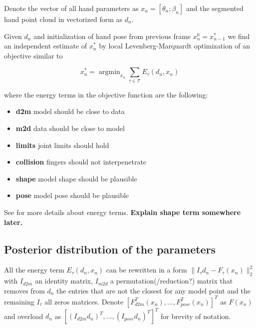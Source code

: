 \documentclass[10pt,twocolumn,letterpaper]{article}
\begin{document}
Denote the vector of all hand parameters as $x_n = [\theta_n; \beta_n]$ and the segmented hand point cloud in vectorized form as $d_n$. 

Given $d_n$ and initialization of hand pose from previous frame $x_n^0 = x_{n - 1}^*$ we find an independent estimate of $x_n^*$ by local Levenberg-Marquardt optimization of an objective similar to \cite{tkach2016sphere}

\begin{equation}
x_n^* = \operatorname{argmin}_{x_n} \sum_{\tau \in \mathcal{T}} E_{\tau}(d_n, x_n) \label{eq:energies}
\end{equation}

where the energy terms in the objective function are the following:

\begin{itemize}
\item \textbf{d2m} model should be close to data
\vspace{-1em}
\item \textbf{m2d} data should be close to model
\vspace{-1em}
\item \textbf{limits} joint limits should hold
\vspace{-1em}
\item \textbf{collision} fingers should not interpenetrate
\vspace{-1em}
\item \textbf{shape} model shape should be plausible
\vspace{-1em}
\item \textbf{pose} model pose should be plausible
\end{itemize}

See \cite{tkach2016sphere} for more details about energy terms. \textbf{\color{accent} Explain shape term somewhere later.}

\subsection {Posterior distribution of the parameters} \label{sec:posterior}

All the energy term $E_{\tau}(d_n, x_n)$ can be rewritten in a form $\|I_{\tau} d_n - F_{\tau} (x_n)\|_2^2$ with $I_{d2m}$ an identity matrix, $I_{m2d}$ a permutation(/reduction?) matrix that removes from $d_n$ the entries that are not the closest for any model point and the remaining $I_{\tau}$ all zeros matrices. 
Denote $\left[F_{d2m}^T(x_n), ..., F_{pose}^T(x_n)\right]^T$ as $F(x_n)$ and overload $d_n$ as  $\left[(I_{d2m} d_n)^T, ..., (I_{pose} d_n)^T\right]^T$  for brevity of notation.
\end{document}
